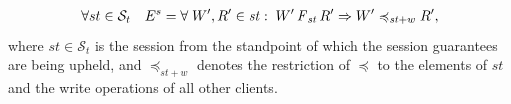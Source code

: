 \documentclass[acmlarge, ,11pt]{acmart}
\begin{document}
\begin{align}
  \begin{split}
  \forall st \in \mathcal{S}_t \quad E^{s} = \forall \;  {W}', {R}' \in \mathit{st} : \;
  {W}' \operatorname{\it F}_\mathit{st} {R}'
 \Rightarrow
 {W}' \preccurlyeq_{\mathit{st}+w} {R}',
  \end{split}
  \end{align}\label{eqn:RYW} where $\mathit{st}\in\mathcal{S}_t$ is the session from the standpoint of which the session guarantees are being upheld, and $\preccurlyeq_{\mathit{st}+w}$ denotes the restriction of $\preccurlyeq$ to the elements of $\mathit{st}$ and the write operations of all other clients.
\end{document}
